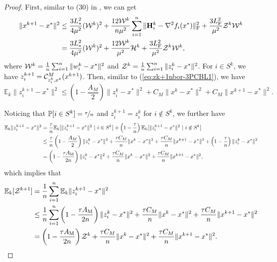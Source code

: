 \documentclass[11pt]{article}
\begin{document}
	
	\begin{proof}
		
		First, similar to (30) in \citep{qian2021basis}, we can get 
		\begin{align}
			\|x^{k+1}-x^*\|^2 & \leq \frac{3L_{*}^2}{4\mu^2}({\cal W}^k)^2 + \frac{12{\cal W}^k}{n\mu^2} \sum_{i=1}^n \|\mathbf{H}_i^k-\nabla^2 f_i(x^*)\|^2_{\rm F} + \frac{3L_{\rm F}^2}{\mu^2} {\cal Z}^k {\cal W}^k \nonumber \\ 
			& = \frac{3L_{*}^2}{4\mu^2}({\cal W}^k)^2  +  \frac{12{\cal W}^k}{\mu^2} {\cal H}^k + \frac{3L_{\rm F}^2}{\mu^2} {\cal Z}^k {\cal W}^k, \label{eq:xk+1-3PCBL2}
		\end{align}
		where ${\cal W}^k = \frac{1}{n} \sum_{i=1}^n \|w_i^k - x^*\|^2$ and ${\cal Z}^k = \frac{1}{n} \sum_{i=1}^n \|z_i^k-x^*\|^2$. For $i \in S^k$, we have $z_i^{k+1} = {\mathcal{C}}^M_{z_i^k, x^k} (x^{k+1})$.  Then, similar to (\ref{eq:zk+1nbor-3PCBL1}), we have 
		$$
		\mathbb{E}_k \|z_i^{k+1} - x^*\|^2 \leq \left(  1 - \frac{A_M}{2}  \right) \|z_i^k - x^*\|^2 + C_M\|x^k-x^*\|^2 + C_M \|x^{k+1}-x^*\|^2. 
		$$
		
		Noticing that $\mathbb{P}[i \in S^k] = \nicefrac{\tau}{n}$ and $z_i^{k+1}=z_i^k$ for $i\notin S^k$, we further have 
		\begin{align*}
			\mathbb{E}_k\|z_i^{k+1} - x^*\|^2 & = \frac{\tau}{n} \mathbb{E}_k[\|z_i^{k+1} - x^*\|^2 \ | \  i\in S^k ] + \left(  1 - \frac{\tau}{n}  \right) \mathbb{E}_k[\|z_i^{k+1} - x^*\|^2 \ | \  i\notin S^k ] \\ 
			& \leq \frac{\tau}{n} \left(1 - \frac{A_M}{2} \right) \|z_i^k - x^*\|^2 + \frac{\tau C_M}{n} \|x^k-x^*\|^2 +  \frac{\tau C_M}{n} \|x^{k+1} - x^*\|^2 + \left(  1 - \frac{\tau}{n}  \right) \|z_i^k-x^*\|^2 \\ 
			& = \left(  1 - \frac{\tau A_{\rm M}}{2n}  \right) \|z_i^k-x^*\|^2 + \frac{\tau C_M}{n} \|x^k-x^*\|^2 +  \frac{\tau C_M}{n} \|x^{k+1} - x^*\|^2, 
		\end{align*}
		which implies that 
		\begin{align}
			\mathbb{E}_k [{\cal Z}^{k+1}] & = \frac{1}{n} \sum_{i=1}^n \mathbb{E}_k \|z_i^{k+1}-x^*\|^2  \nonumber \\ 
			& \leq \frac{1}{n} \sum_{i=1}^n \left(  1 - \frac{\tau A_{\rm M}}{2n}  \right) \|z_i^k-x^*\|^2 + \frac{\tau C_M}{n} \|x^k-x^*\|^2 +  \frac{\tau C_M}{n} \|x^{k+1} - x^*\|^2  \nonumber \\ 
			& =  \left(  1 - \frac{\tau A_{\rm M}}{2n}  \right) {\cal Z}^k +  \frac{\tau C_M}{n} \|x^k-x^*\|^2 +  \frac{\tau C_M}{n} \|x^{k+1} - x^*\|^2. \label{eq:Zk+1-3PCBL2}
		\end{align}
		

\end{proof}
\end{document}
